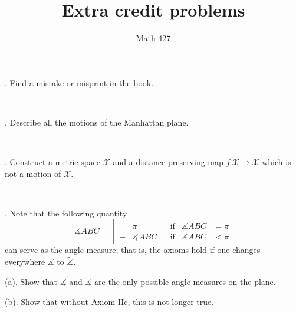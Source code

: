 \documentclass[oneside,a4paper]{article}
\begin{document}
\title{Extra credit problems}
\author{Math 427}
\date{}
\maketitle

\textit{}

. Find a mistake or misprint in the book.

\ 

. Describe all the motions of the Manhattan plane.

\ 

. Construct a metric space $\mathcal X$ and a distance preserving map $f\:\mathcal X\to \mathcal X$ which is not a motion of $\mathcal X$.

\ 

. Note that the following quantity 
$$\tilde
\measuredangle ABC=\left[
\begin{aligned}
&\pi&&\text{if}&\measuredangle ABC&=\pi
\\
-&\measuredangle ABC&&\text{if}&\measuredangle ABC&<\pi
\end{aligned}
\right.$$
can serve as the angle measure; 
that is, the axioms hold if one changes everywhere $\measuredangle$ to $\tilde\measuredangle$.

\noi (a). Show that $\measuredangle$ and $\tilde\measuredangle$ are the only possible angle measures on the plane. 

\noi (b). Show that without Axiom IIc, this is not longer true.
\end{document}
